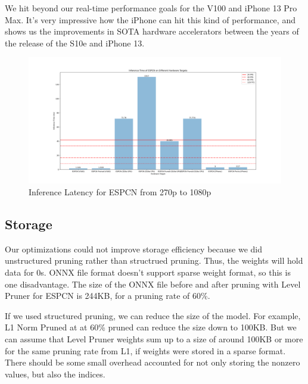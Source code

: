 \documentclass{article}
\begin{document}
We hit beyond our real-time performance goals for the V100 and iPhone 13 Pro Max. It's very impressive how the iPhone can hit this kind of performance, and shows us the improvements in SOTA hardware accelerators between the years of the release of the S10e and iPhone 13.

\begin{figure}
    \centerline{\includegraphics[width=8in]{../final/figures/inference_times.png}}
    \caption{Inference Latency for ESPCN from 270p to 1080p}
    \label{fig:inference-times}
\end{figure}


\subsection{Storage}
Our optimizations could not improve storage efficiency because we did unstructured pruning rather than structrued pruning. Thus, the weights will hold data for 0s. ONNX file format doesn't support sparse weight format, so this is one disadvantage. The size of the ONNX file before and after pruning with Level Pruner for ESPCN is 244KB, for a pruning rate of 60\%. 

If we used structured pruning, we can reduce the size of the model. For example, L1 Norm Pruned at at 60\% pruned can reduce the size down to 100KB. But we can assume that Level Pruner weights sum up to a size of around 100KB or more for the same pruning rate from L1, if weights were stored in a sparse format. There should be some small overhead accounted for not only storing the nonzero values, but also the indices.
\end{document}

